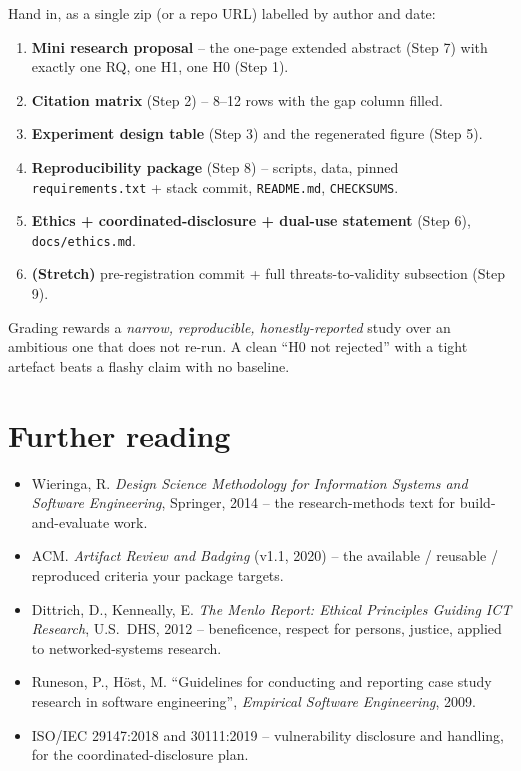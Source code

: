 \documentclass[11pt,a4paper]{article}
\begin{document}
\begin{deliverbox}
Hand in, as a single zip (or a repo URL) labelled by author and date:
\begin{enumerate}\setlength{\itemsep}{1pt}
  \item \textbf{Mini research proposal} -- the one-page extended abstract (Step 7) with exactly one RQ, one H1, one H0 (Step 1).
  \item \textbf{Citation matrix} (Step 2) -- 8--12 rows with the gap column filled.
  \item \textbf{Experiment design table} (Step 3) and the regenerated figure (Step 5).
  \item \textbf{Reproducibility package} (Step 8) -- scripts, data, pinned \texttt{requirements.txt} + stack commit, \texttt{README.md}, \texttt{CHECKSUMS}.
  \item \textbf{Ethics + coordinated-disclosure + dual-use statement} (Step 6), \texttt{docs/ethics.md}.
  \item \textbf{(Stretch)} pre-registration commit + full threats-to-validity subsection (Step 9).
\end{enumerate}
Grading rewards a \emph{narrow, reproducible, honestly-reported} study over an ambitious one that does not re-run. A clean ``H0 not rejected'' with a tight artefact beats a flashy claim with no baseline.
\end{deliverbox}

\section*{Further reading}

\begin{notebox}
\begin{itemize}\setlength{\itemsep}{1pt}
  \item Wieringa, R. \emph{Design Science Methodology for Information Systems and Software Engineering}, Springer, 2014 -- the research-methods text for build-and-evaluate work.
  \item ACM. \emph{Artifact Review and Badging} (v1.1, 2020) -- the available / reusable / reproduced criteria your package targets.
  \item Dittrich, D., Kenneally, E. \emph{The Menlo Report: Ethical Principles Guiding ICT Research}, U.S.\ DHS, 2012 -- beneficence, respect for persons, justice, applied to networked-systems research.
  \item Runeson, P., Höst, M. ``Guidelines for conducting and reporting case study research in software engineering'', \emph{Empirical Software Engineering}, 2009.
  \item ISO/IEC 29147:2018 and 30111:2019 -- vulnerability disclosure and handling, for the coordinated-disclosure plan.
\end{itemize}
\end{notebox}
\end{document}
